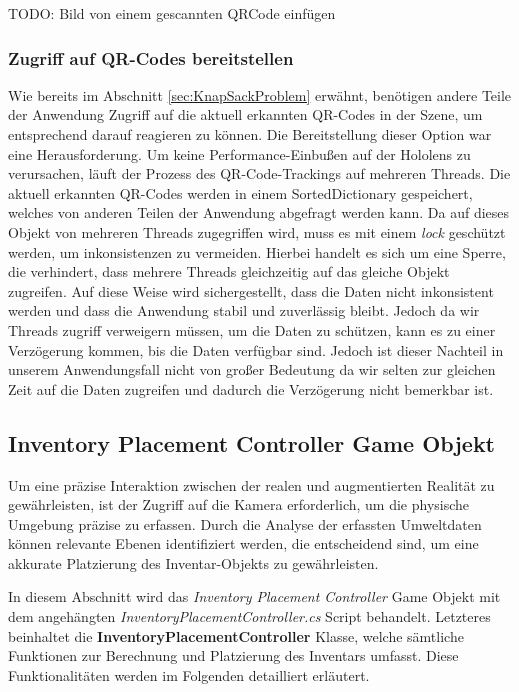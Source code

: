 TODO: Bild von einem gescannten QRCode einfügen

\subsubsection{Zugriff auf QR-Codes bereitstellen}
Wie bereits im Abschnitt \ref{sec:KnapSackProblem} erwähnt, benötigen andere Teile der Anwendung Zugriff auf
die aktuell erkannten QR-Codes in der Szene, um entsprechend darauf reagieren zu können. Die Bereitstellung dieser Option war eine Herausforderung.
Um keine Performance-Einbußen auf der Hololens zu verursachen, läuft der Prozess des QR-Code-Trackings auf
mehreren Threads. Die aktuell erkannten QR-Codes werden in einem SortedDictionary gespeichert, welches von anderen Teilen
der Anwendung abgefragt werden kann. Da auf dieses Objekt von mehreren Threads zugegriffen wird, muss es mit einem
\textit{lock} geschützt werden, um inkonsistenzen zu vermeiden. Hierbei handelt es sich um eine Sperre, die verhindert,
dass mehrere Threads gleichzeitig auf das gleiche Objekt zugreifen. Auf diese Weise wird sichergestellt, dass die Daten
nicht inkonsistent werden und dass die Anwendung stabil und zuverlässig bleibt. Jedoch da wir Threads zugriff verweigern
müssen, um die Daten zu schützen, kann es zu einer Verzögerung kommen, bis die Daten verfügbar sind. Jedoch ist dieser
Nachteil in unserem Anwendungsfall nicht von großer Bedeutung da wir selten zur gleichen Zeit auf die Daten zugreifen und
dadurch die Verzögerung nicht bemerkbar ist.

\subsection{Inventory Placement Controller Game Objekt} 
Um eine präzise Interaktion zwischen der realen und augmentierten Realität zu gewährleisten, ist der Zugriff auf die
Kamera erforderlich, um die physische Umgebung präzise zu erfassen. Durch die Analyse der erfassten Umweltdaten können
relevante Ebenen identifiziert werden, die entscheidend sind, um eine akkurate Platzierung des Inventar-Objekts zu gewährleisten.

In diesem Abschnitt wird das \textit{Inventory Placement Controller} Game Objekt mit dem angehängten
\textit{InventoryPlacementController.cs} Script behandelt. Letzteres beinhaltet die \textbf{InventoryPlacementController}
Klasse, welche sämtliche Funktionen zur Berechnung und Platzierung des Inventars umfasst. Diese Funktionalitäten werden
im Folgenden detailliert erläutert.

